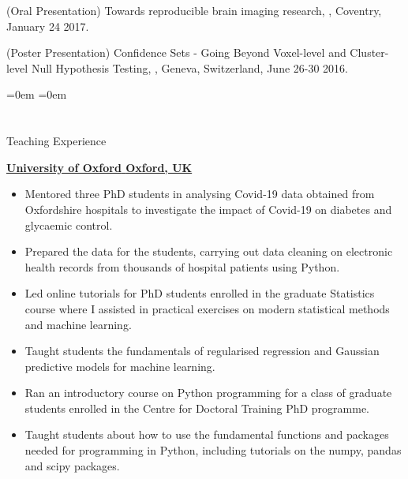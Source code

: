 \documentclass{my_cv}
\begin{document}
(Oral Presentation) Towards reproducible brain imaging research, , Coventry, January 24 2017.

(Poster Presentation) Confidence Sets - Going Beyond Voxel-level and Cluster-level Null Hypothesis Testing, , Geneva, Switzerland, June 26-30 2016.

\leftskip=0em
\parindent=0em

\section{\faPencilSquareO}{Teaching Experience}

\uline{\large\bfseries{University of Oxford}  \hfill \large\bfseries{Oxford, UK}}
{\begin{addmargin}[2em]{0em}

    \begin{itemize}[topsep=0pt,itemsep=0pt,partopsep=0pt, parsep=0pt] 
    \item Mentored three PhD students in analysing Covid-19 data obtained from Oxfordshire hospitals to investigate the impact of Covid-19 on diabetes and glycaemic control.
    \item Prepared the data for the students, carrying out data cleaning on electronic health records from thousands of hospital patients using Python.
    \end{itemize}
    \begin{itemize}[topsep=0pt,itemsep=0pt,partopsep=0pt, parsep=0pt] 
    \item Led online tutorials for PhD students enrolled in the graduate Statistics course where I assisted in practical exercises on modern statistical methods and machine learning.
    \item Taught students the fundamentals of regularised regression and Gaussian predictive models for machine learning.
    \end{itemize}
    \begin{itemize}[topsep=0pt,itemsep=0pt,partopsep=0pt, parsep=0pt] 
    \item Ran an introductory course on Python programming for a class of graduate students enrolled in the Centre for Doctoral Training PhD programme.
    \item Taught students about how to use the fundamental functions and packages needed for programming in Python, including tutorials on the numpy, pandas and scipy packages.
    \end{itemize}
\end{addmargin}}
\end{document}

